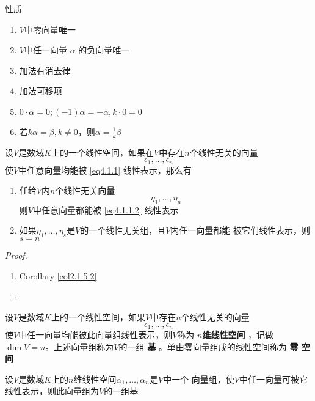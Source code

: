 \documentclass[11pt]{article}
\begin{document}
性质
\begin{enumerate}
\item \(V\)中零向量唯一
\item \(V\)中任一向量 \(\alpha\) 的负向量唯一
\item 加法有消去律
\item 加法可移项
\item \(0\cdot\alpha=0;(-1)\alpha=-\alpha,k\cdot0=0\)
\item 若\(k\alpha=\beta,k\neq0\)，则\(\alpha=\frac{1}{k}\beta\)
\end{enumerate}


\begin{proposition}[]
设\(V\)是数域\(K\)上的一个线性空间，如果在\(V\)中存在\(n\)个线性无关的向量
\begin{equation}
\epsilon_1,\dots,\epsilon_n\label{eq4.1.1}
\end{equation}
使\(V\)中任意向量均能被 \eqref{eq4.1.1} 线性表示，那么有
\begin{enumerate}
\item 任给\(V\)内\(n\)个线性无关向量
\begin{equation}
\eta_1,\dots,\eta_n\label{eq4.1.1.2}
\end{equation}
则\(V\)中任意向量都能被 \eqref{eq4.1.1.2} 线性表示
\item 如果\(\eta_1,\dots,\eta_s\)是\(V\)的一个线性无关组，且\(V\)内任一向量都能
被它们线性表示，则\(s=n\)
\end{enumerate}
\end{proposition}

\begin{proof}
\begin{enumerate}
\item Corollary \ref{col2.1.5.2}
\end{enumerate}
\end{proof}

\begin{definition}[]
设\(V\)是数域\(K\)上的一个线性空间，如果\(V\)中存在\(n\)个线性无关的向量
\begin{equation*}
\epsilon_1,\dots,\epsilon_n
\end{equation*}
使\(V\)中任一向量均能被此向量组线性表示，则\(V\)称为 \textbf{\(n\)维线性空间} ，记做
\(\dim V=n\)。上述向量组称为\(V\)的一组 \textbf{基} 。单由零向量组成的线性空间称为 \textbf{零
空间}
\end{definition}

\begin{corollary}[]
设\(V\)是数域\(K\)上的\(n\)维线性空间\(\alpha_1,\dots,\alpha_n\)是\(V\)中一个
向量组，使\(V\)中任一向量可被它线性表示，则此向量组为\(V\)的一组基
\end{corollary}
\end{document}
